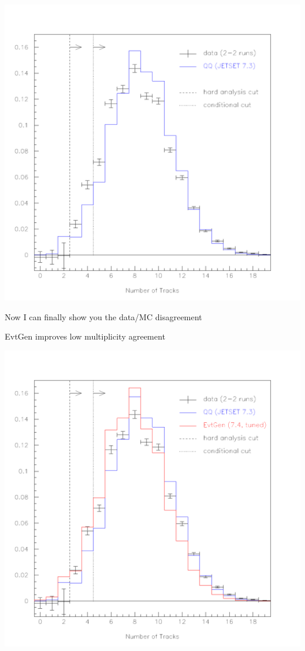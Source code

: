 \documentclass[landscape]{article}
\begin{document}
\begin{center}
\includegraphics[height=0.9\textheight]{comp_tracks1.pdf}
\end{center}
\pagebreak

{\Huge Now I can finally show you the data/MC disagreement}

\vspace{1 cm}
EvtGen improves low multiplicity agreement
\vspace{-1 cm}

\begin{center}
\includegraphics[height=0.9\textheight]{comp_tracks2.pdf}
\end{center}
\pagebreak
\end{document}
